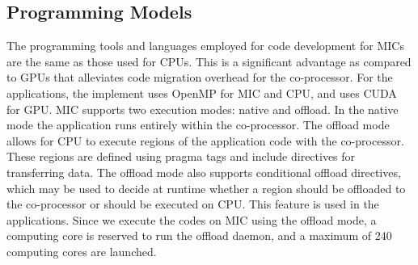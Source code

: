 \subsection{Programming Models\\}
The programming tools and languages employed for code development for MICs are the same as those used for CPUs. This is a significant advantage as compared to GPUs that alleviates code migration overhead for the co-processor. For the applications, the implement uses OpenMP for MIC and CPU, and uses CUDA for GPU. MIC supports two execution modes: native and offload. In the native mode the application runs entirely within the co-processor. The offload mode allows for CPU to execute regions of the application code with the co-processor. These regions are defined using pragma tags and include directives for transferring data. The offload mode also supports conditional offload directives, which may be used to decide at runtime whether a region should be offloaded to the co-processor or should be executed on CPU. This feature is used in the applications. Since we execute the codes on MIC using the offload mode, a computing core is reserved to run the offload daemon, and a maximum of 240 computing cores are launched.
  
  


  
